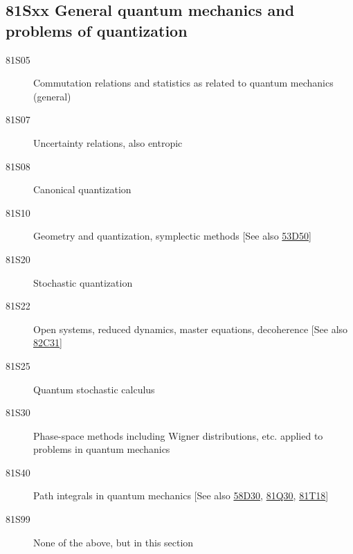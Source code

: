\subsection*{81Sxx  General quantum mechanics and problems of quantization }\label{81Sxx}
\begin{description}  
\item [81S05]\label{81S05} Commutation relations and statistics as related to quantum mechanics (general)
\item [81S07]\label{81S07} Uncertainty relations, also entropic
\item [81S08]\label{81S08} Canonical quantization
\item [81S10]\label{81S10} Geometry and quantization, symplectic methods [See also \hyperref[53D50]{53D50}]
\item [81S20]\label{81S20} Stochastic quantization
\item [81S22]\label{81S22} Open systems, reduced dynamics, master equations, decoherence [See also \hyperref[82C31]{82C31}]
\item [81S25]\label{81S25} Quantum stochastic calculus
\item [81S30]\label{81S30} Phase-space methods including Wigner distributions, etc. applied to problems in quantum mechanics
\item [81S40]\label{81S40} Path integrals in quantum mechanics [See also \hyperref[58D30]{58D30}, \hyperref[81Q30]{81Q30}, \hyperref[81T18]{81T18}]
\item [81S99]\label{81S99} None of the above, but in this section
\end{description}
